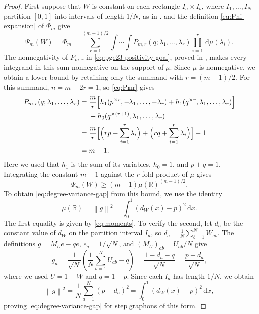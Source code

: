 \documentclass[11pt]{article}
\theoremstyle{remark}
\numberwithin{equation}{section}
\newcommand{\R}{\mathbb R}
\newcommand{\norm}[1]{\left\lVert #1\right\rVert}
\newcommand{\dd}{\,\mathrm d}
\newcommand{\dW}{d_W}
\newcommand{\rep}[2]{#1^{\times #2}}
\begin{document}
\begin{proof}
  First suppose that $W$ is constant on each rectangle $I_a\times I_b$,
  where $I_1,\ldots,I_N$ partition $[0,1]$ into intervals of length $1/N$,
  as in .
   and the definition \eqref{eq:Phi-expansion} of $\Phi_m$ give
  \[
    \Psi_m(W)=\Phi_m
    =\sum_{r=1}^{(m-1)/2}
      \int\!\cdots\!\int
      P_{m,r}(q;\lambda_1,\ldots,\lambda_r)
      \prod_{i=1}^r\dd\mu(\lambda_i).
  \]
  The nonnegativity of $P_{m,r}$ in \eqref{eq:pge23-positivity-goal}, proved in
  , makes every integrand in
  this sum nonnegative on the support of $\mu$. Since $\mu$ is nonnegative,
  we obtain a lower bound by retaining only the summand with $r=(m-1)/2$.
  For this summand, $n=m-2r=1$, so \eqref{eq:Pmr} gives
  \begin{align*}
    P_{m,r}(q;\lambda_1,\ldots,\lambda_r)
    ={}&\frac mr\Bigl[
      h_1(\rep pr,-\lambda_1,\ldots,-\lambda_r)
      +h_1(\rep qr,\lambda_1,\ldots,\lambda_r)
    \Bigr]\\
    &-h_0(\rep q{(r+1)},\lambda_1,\ldots,\lambda_r)\\
    ={}&\frac mr\Bigl[
      \Bigl(rp-\sum_{i=1}^r\lambda_i\Bigr)
      +\Bigl(rq+\sum_{i=1}^r\lambda_i\Bigr)
    \Bigr]-1\\
    ={}&m-1.
  \end{align*}
  Here we used that $h_1$ is the sum of its variables, $h_0=1$, and $p+q=1$.
  Integrating the constant $m-1$ against the $r$-fold product of $\mu$ gives
  \[
    \Psi_m(W)\ge(m-1)\mu(\R)^{(m-1)/2}.
  \]
  To obtain \eqref{eq:degree-variance-gap} from this bound, we use the identity
  \[
    \mu(\R)=\norm g^2
    =\int_0^1(\dW(x)-p)^2\dd x.
  \]
  The first equality is given by \eqref{eq:moments}.
  To verify the second, let $d_a$ be the constant value of $\dW$
  on the partition interval $I_a$, so
  $d_a=\frac1N\sum_{b=1}^N W_{ab}$.
  The definitions $g=M_Ue-qe$, $e_a=1/\sqrt N$, and
  $(M_U)_{ab}=U_{ab}/N$ give
  \[
    g_a=\frac1{\sqrt N}\left(\frac1N\sum_{b=1}^N U_{ab}-q\right)
    =\frac{1-d_a-q}{\sqrt N}
    =\frac{p-d_a}{\sqrt N},
  \]
  where we used $U=1-W$ and $q=1-p$.
  Since each $I_a$ has length $1/N$, we obtain
  \[
    \norm g^2=\frac1N\sum_{a=1}^N(p-d_a)^2
    =\int_0^1(\dW(x)-p)^2\dd x,
  \]
  proving \eqref{eq:degree-variance-gap} for step graphons of this form.


\end{proof}
\end{document}
